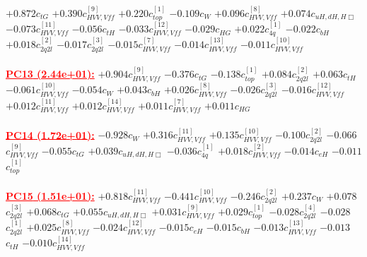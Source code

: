 \documentclass{article}
\begin{document}
{$+0.872$}{\rm $c_{tG}$} 
{$+0.390$}{\rm $c_{HVV,Vff}^{[9]}$} 
{$+0.220$}{\rm $c_{top}^{[1]}$} 
{$-0.109$}{\rm $c_{W}$} 
{$+0.096$}{\rm $c_{HVV,Vff}^{[8]}$} 
{$+0.074$}{\rm $c_{uH,dH,H\Box}$} 
{$-0.073$}{\rm $c_{HVV,Vff}^{[11]}$} 
{$-0.056$}{\rm $c_{tH}$} 
{$-0.033$}{\rm $c_{HVV,Vff}^{[12]}$} 
{$-0.029$}{\rm $c_{HG}$} 
{$+0.022$}{\rm $c_{4q}^{[1]}$} 
{$-0.022$}{\rm $c_{bH}$} 
{$+0.018$}{\rm $c_{2q2l}^{[2]}$} 
{$-0.017$}{\rm $c_{2q2l}^{[3]}$} 
{$-0.015$}{\rm $c_{HVV,Vff}^{[7]}$} 
{$-0.014$}{\rm $c_{HVV,Vff}^{[13]}$} 
{$-0.011$}{\rm $c_{HVV,Vff}^{[10]}$} 
 \nonumber \\ \nonumber \\ 
\noindent \textcolor{red}{\underline{\bf{PC13} (2.44e+01):}}
{$+0.904$}{\rm $c_{HVV,Vff}^{[9]}$} 
{$-0.376$}{\rm $c_{tG}$} 
{$-0.138$}{\rm $c_{top}^{[1]}$} 
{$+0.084$}{\rm $c_{2q2l}^{[2]}$} 
{$+0.063$}{\rm $c_{tH}$} 
{$-0.061$}{\rm $c_{HVV,Vff}^{[10]}$} 
{$-0.054$}{\rm $c_{W}$} 
{$+0.043$}{\rm $c_{bH}$} 
{$+0.026$}{\rm $c_{HVV,Vff}^{[8]}$} 
{$-0.026$}{\rm $c_{2q2l}^{[3]}$} 
{$-0.016$}{\rm $c_{HVV,Vff}^{[12]}$} 
{$+0.012$}{\rm $c_{HVV,Vff}^{[11]}$} 
{$+0.012$}{\rm $c_{HVV,Vff}^{[14]}$} 
{$+0.011$}{\rm $c_{HVV,Vff}^{[7]}$} 
{$+0.011$}{\rm $c_{HG}$} 
 \nonumber \\ \nonumber \\ 
\noindent \textcolor{red}{\underline{\bf{PC14} (1.72e+01):}}
{$-0.928$}{\rm $c_{W}$} 
{$+0.316$}{\rm $c_{HVV,Vff}^{[11]}$} 
{$+0.135$}{\rm $c_{HVV,Vff}^{[10]}$} 
{$-0.100$}{\rm $c_{2q2l}^{[2]}$} 
{$-0.066$}{\rm $c_{HVV,Vff}^{[9]}$} 
{$-0.055$}{\rm $c_{tG}$} 
{$+0.039$}{\rm $c_{uH,dH,H\Box}$} 
{$-0.036$}{\rm $c_{4q}^{[1]}$} 
{$+0.018$}{\rm $c_{HVV,Vff}^{[2]}$} 
{$-0.014$}{\rm $c_{eH}$} 
{$-0.011$}{\rm $c_{top}^{[1]}$} 
 \nonumber \\ \nonumber \\ 
\noindent \textcolor{red}{\underline{\bf{PC15} (1.51e+01):}}
{$+0.818$}{\rm $c_{HVV,Vff}^{[11]}$} 
{$-0.441$}{\rm $c_{HVV,Vff}^{[10]}$} 
{$-0.246$}{\rm $c_{2q2l}^{[2]}$} 
{$+0.237$}{\rm $c_{W}$} 
{$+0.078$}{\rm $c_{2q2l}^{[3]}$} 
{$+0.068$}{\rm $c_{tG}$} 
{$+0.055$}{\rm $c_{uH,dH,H\Box}$} 
{$+0.031$}{\rm $c_{HVV,Vff}^{[9]}$} 
{$+0.029$}{\rm $c_{top}^{[1]}$} 
{$-0.028$}{\rm $c_{2q2l}^{[4]}$} 
{$-0.028$}{\rm $c_{2q2l}^{[1]}$} 
{$+0.025$}{\rm $c_{HVV,Vff}^{[8]}$} 
{$-0.024$}{\rm $c_{HVV,Vff}^{[12]}$} 
{$-0.015$}{\rm $c_{eH}$} 
{$-0.015$}{\rm $c_{bH}$} 
{$-0.013$}{\rm $c_{HVV,Vff}^{[13]}$} 
{$-0.013$}{\rm $c_{tH}$} 
{$-0.010$}{\rm $c_{HVV,Vff}^{[14]}$} 
 \nonumber \\ \nonumber \\ 
\end{document}
